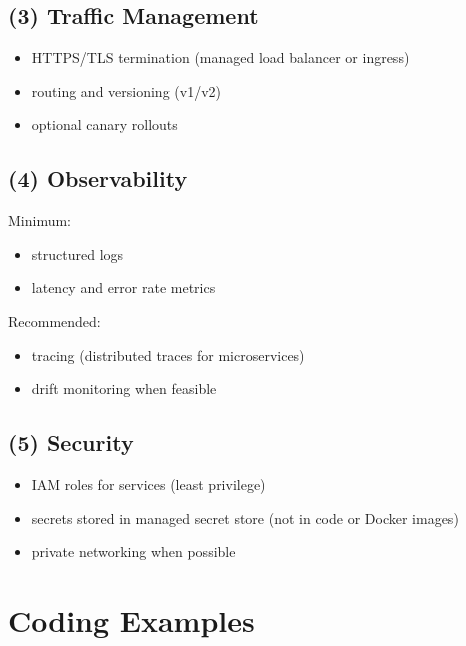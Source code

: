 \documentclass[11pt]{article}
\begin{document}
\subsection{(3) Traffic Management}
\begin{itemize}
  \item HTTPS/TLS termination (managed load balancer or ingress)
  \item routing and versioning (v1/v2)
  \item optional canary rollouts
\end{itemize}

\subsection{(4) Observability}
Minimum:
\begin{itemize}
  \item structured logs
  \item latency and error rate metrics
\end{itemize}
Recommended:
\begin{itemize}
  \item tracing (distributed traces for microservices)
  \item drift monitoring when feasible
\end{itemize}

\subsection{(5) Security}
\begin{itemize}
  \item IAM roles for services (least privilege)
  \item secrets stored in managed secret store (not in code or Docker images)
  \item private networking when possible
\end{itemize}

\section{Coding Examples}
\end{document}
